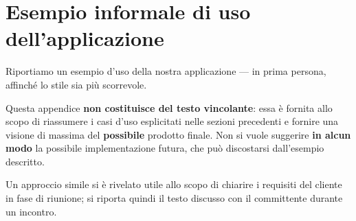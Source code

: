 
\appendix
\section{Esempio informale di uso dell'applicazione }


Riportiamo un esempio d'uso della nostra applicazione --- in prima persona, affinché lo stile sia più scorrevole.

Questa appendice \textbf{non costituisce del testo vincolante}: essa è fornita allo scopo di riassumere i casi d'uso esplicitati nelle sezioni precedenti e fornire una visione di massima del \textbf{possibile} prodotto finale. Non si vuole suggerire \textbf{in alcun modo} la possibile implementazione futura, che può discostarsi dall'esempio descritto.

Un approccio simile si è rivelato utile allo scopo di chiarire i requisiti del cliente in fase di riunione; si riporta quindi il testo discusso con il committente durante un incontro.

